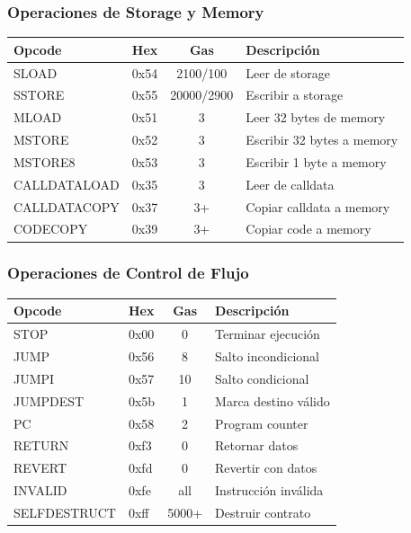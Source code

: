 \documentclass[11pt,a4paper,twoside,openright]{book}
\theoremstyle{definition}
\theoremstyle{plain}
\theoremstyle{remark}
\begin{document}
\subsubsection{Operaciones de Storage y Memory}

\begin{center}
\begin{tabular}{llcl}
\toprule
\textbf{Opcode} & \textbf{Hex} & \textbf{Gas} & \textbf{Descripción} \\
\midrule
SLOAD & 0x54 & 2100/100 & Leer de storage \\
SSTORE & 0x55 & 20000/2900 & Escribir a storage \\
MLOAD & 0x51 & 3 & Leer 32 bytes de memory \\
MSTORE & 0x52 & 3 & Escribir 32 bytes a memory \\
MSTORE8 & 0x53 & 3 & Escribir 1 byte a memory \\
CALLDATALOAD & 0x35 & 3 & Leer de calldata \\
CALLDATACOPY & 0x37 & 3+ & Copiar calldata a memory \\
CODECOPY & 0x39 & 3+ & Copiar code a memory \\
\bottomrule
\end{tabular}
\end{center}

\subsubsection{Operaciones de Control de Flujo}

\begin{center}
\begin{tabular}{llcl}
\toprule
\textbf{Opcode} & \textbf{Hex} & \textbf{Gas} & \textbf{Descripción} \\
\midrule
STOP & 0x00 & 0 & Terminar ejecución \\
JUMP & 0x56 & 8 & Salto incondicional \\
JUMPI & 0x57 & 10 & Salto condicional \\
JUMPDEST & 0x5b & 1 & Marca destino válido \\
PC & 0x58 & 2 & Program counter \\
RETURN & 0xf3 & 0 & Retornar datos \\
REVERT & 0xfd & 0 & Revertir con datos \\
INVALID & 0xfe & all & Instrucción inválida \\
SELFDESTRUCT & 0xff & 5000+ & Destruir contrato \\
\bottomrule
\end{tabular}
\end{center}
\end{document}
